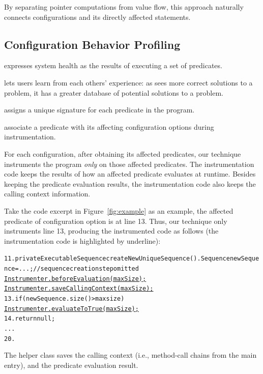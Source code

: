 
By separating pointer computations from value flow,
this approach naturally connects configurations and its
directly affected statements.


\subsection{Configuration Behavior Profiling}
\label{sec:profiling}

\ourtool expresses system health as the results of executing a set of predicates.

\ourtool lets users learn from each others' experience: as \ourtool sees more correct
solutions to a problem, it has a greater database of potential solutions to
a problem.

\ourtool assigns a unique signature for each predicate in the program.

associate a predicate with its affecting configuration options during instrumentation.

For each configuration, after obtaining its affected predicates, our technique
instruments the program \textit{only} on those affected predicates. The instrumentation
code keeps the results of how an affected predicate evaluates at runtime. Besides keeping
the predicate evaluation results, the instrumentation code also keeps
the calling context information.

Take the code excerpt in Figure~\ref{fig:example} as an example, the affected
predicate of configuration option  is at line 13. Thus, our technique
only instruments line 13, producing the instrumented
code as follows (the instrumentation code is highlighted by underline):


\begin{CodeOut}
\begin{alltt}
11. private ExecutableSequence createNewUniqueSequence() .   Sequence newSequence = ...; //sequence creation step omitted
      \underline{Instrumenter.beforeEvaluation(maxSize);}
      \underline{Instrumenter.saveCallingContext(maxSize);}
13.   if (newSequence.size() > maxsize) \ttlcb
        \underline{Instrumenter.evaluateToTrue(maxSize);}
14.     return null;
      ...
20. \ttrcb
\end{alltt}
\end{CodeOut}

The helper class  saves the calling context (i.e.,
method-call chains from the main entry), and the predicate evaluation result.


